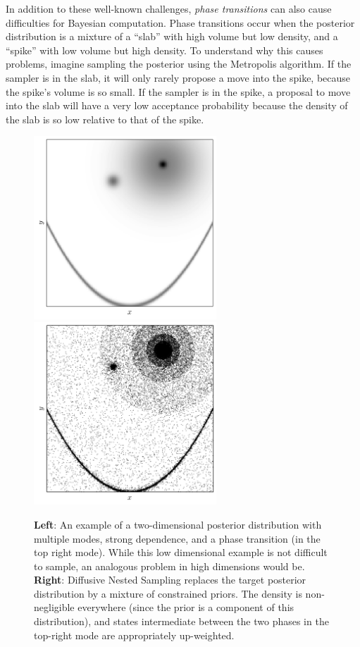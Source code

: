 \documentclass[letterpaper, 11pt]{article}
\begin{document}
In addition to these well-known challenges,
{\it phase transitions} \citep{skilling} can also cause difficulties for
Bayesian computation. Phase transitions occur when the posterior distribution
is a mixture of a ``slab'' with high volume but low density, and a ``spike''
with low volume but high density. To understand why this causes problems,
imagine sampling the posterior using the Metropolis algorithm. If the sampler
is in the slab, it will only rarely propose a move into the spike, because the
spike's volume is so small. If the sampler is in the spike, a proposal to move
into the slab will have a very low acceptance probability because the density
of the slab is so low relative to that of the spike.


\begin{figure}
\begin{minipage}[lr]{\textwidth}
\begin{center}
\includegraphics[width=2.7in]{challenges.pdf}
\includegraphics[width=2.7in]{dnest.png}
\end{center}
\end{minipage}
\caption{{\bf Left}: An example of a two-dimensional posterior distribution
with multiple modes, strong dependence, and a phase transition (in the top
right mode). While this low dimensional example is not difficult to sample,
an analogous problem in high dimensions would be. {\bf Right}: Diffusive
Nested Sampling replaces the target posterior distribution by a mixture of
constrained priors. The density is non-negligible everywhere (since the prior
is a component of this distribution), and states intermediate between the two
phases in the top-right mode are appropriately up-weighted.
\label{fig:challenges}}
\end{figure}
\end{document}
